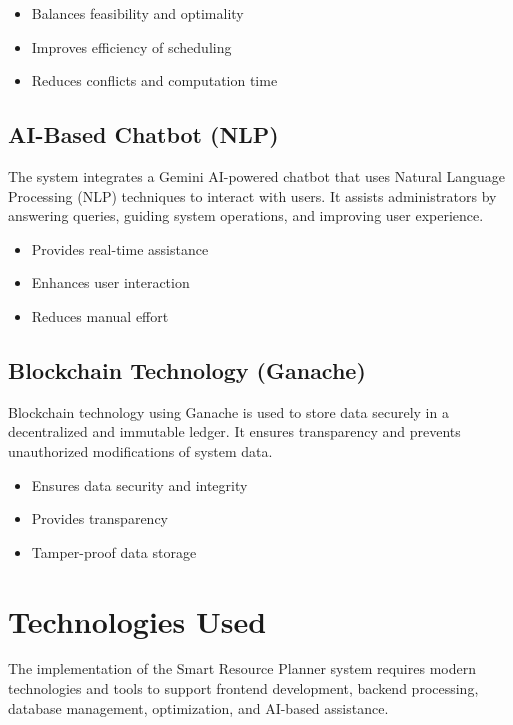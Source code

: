 \documentclass[a4paper, 12pt]{report}
\begin{document}
\begin{itemize}
    \item Balances feasibility and optimality
    \item Improves efficiency of scheduling
    \item Reduces conflicts and computation time
\end{itemize}


\subsection{AI-Based Chatbot (NLP)}
The system integrates a Gemini AI-powered chatbot that uses Natural Language Processing (NLP) techniques to interact with users. It assists administrators by answering queries, guiding system operations, and improving user experience.


\begin{itemize}
    \item Provides real-time assistance
    \item Enhances user interaction
    \item Reduces manual effort
\end{itemize}


\subsection{Blockchain Technology (Ganache)}
Blockchain technology using Ganache is used to store data securely in a decentralized and immutable ledger. It ensures transparency and prevents unauthorized modifications of system data.


\begin{itemize}
    \item Ensures data security and integrity
    \item Provides transparency
    \item Tamper-proof data storage
\end{itemize}

\section{Technologies Used}

The implementation of the Smart Resource Planner system requires modern technologies and tools to support frontend development, backend processing, database management, optimization, and AI-based assistance.
\end{document}
